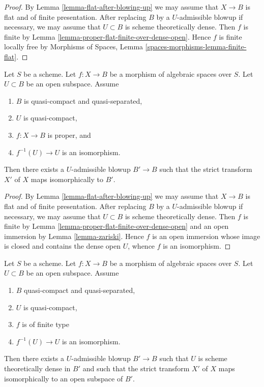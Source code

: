 \begin{proof}
By Lemma \ref{lemma-flat-after-blowing-up} we may assume that
$X \to B$ is flat and of finite presentation. After replacing
$B$ by a $U$-admissible blowup if necessary, we may assume
that $U \subset B$ is scheme theoretically dense. Then $f$ is
finite by Lemma \ref{lemma-proper-flat-finite-over-dense-open}.
Hence $f$ is finite locally free by
Morphisms of Spaces, Lemma \ref{spaces-morphisms-lemma-finite-flat}.
\end{proof}

\begin{lemma}
\label{lemma-isomorphism-after-blowing-up}
Let $S$ be a scheme. Let $f : X \to B$ be a morphism of algebraic
spaces over $S$. Let $U \subset B$ be an open subspace. Assume
\begin{enumerate}
\item $B$ is quasi-compact and quasi-separated,
\item $U$ is quasi-compact,
\item $f : X \to B$ is proper, and
\item $f^{-1}(U) \to U$ is an isomorphism.
\end{enumerate}
Then there exists a $U$-admissible blowup $B' \to B$ such that
the strict transform $X'$ of $X$ maps isomorphically to $B'$.
\end{lemma}

\begin{proof}
By Lemma \ref{lemma-flat-after-blowing-up} we may assume that
$X \to B$ is flat and of finite presentation. After replacing
$B$ by a $U$-admissible blowup if necessary, we may assume
that $U \subset B$ is scheme theoretically dense. Then $f$ is
finite by Lemma \ref{lemma-proper-flat-finite-over-dense-open}
and an open immersion by Lemma \ref{lemma-zariski}. Hence $f$
is an open immersion whose image is closed and contains the
dense open $U$, whence $f$ is an isomorphism.
\end{proof}

\begin{lemma}
\label{lemma-zariski-after-blowup}
Let $S$ be a scheme. Let $f : X \to B$ be a morphism of algebraic spaces
over $S$. Let $U \subset B$ be an open subspace. Assume
\begin{enumerate}
\item $B$ quasi-compact and quasi-separated,
\item $U$ is quasi-compact,
\item $f$ is of finite type
\item $f^{-1}(U) \to U$ is an isomorphism.
\end{enumerate}
Then there exists a $U$-admissible blowup $B' \to B$ such that $U$
is scheme theoretically dense in $B'$ and such that the strict
transform $X'$ of $X$ maps isomorphically to an open subspace of $B'$.
\end{lemma}

